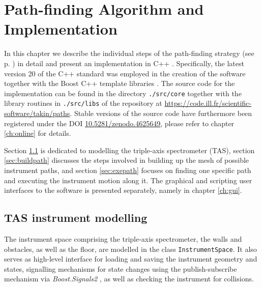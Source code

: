 %
%

\chapter{Path-finding Algorithm and Implementation}
\label{ch:impl}

In this chapter we describe the individual steps of the path-finding strategy (see p. \pageref{sec:strategy}) 
in detail and present an implementation in C++ \cite{Stroustrup2008, Stroustrup2018}. 
Specifically, the latest version 20 of the C++ standard \cite{ISOCPP20} was employed in the creation of the software
together with the Boost C++ template libraries \cite{web_boost}. The source code for the implementation
can be found in the directory \lstinline|./src/core| together with the library routines in \lstinline|./src/libs|
of the repository at \url{https://code.ill.fr/scientific-software/takin/paths}. Stable versions of the
source code have furthermore been registered under the DOI \href{https://doi.org/10.5281/zenodo.4625649}{10.5281/zenodo.4625649},
please refer to chapter \ref{ch:online} for details.

Section \ref{sec:tasmodel} is dedicated to modelling the triple-axis spectrometer (TAS), 
section \ref{sec:buildpath} discusses the steps involved in building up the mesh of possible instrument paths, 
and section \ref{sec:exepath} focuses on finding one specific path and executing the instrument motion along it.
The graphical and scripting user interfaces to the software is presented separately, namely in chapter \ref{ch:gui}.




\section{TAS instrument modelling}
\label{sec:tasmodel}

The instrument space comprising the triple-axis spectrometer, the walls and obstacles, as well as the floor, are modelled in
the class \lstinline[language=C++]|InstrumentSpace|. It also serves as high-level interface for loading and saving
the instrument geometry and states, signalling mechanisms for state changes using the publish-subscribe mechanism
via \textit{Boost.Signals2} \cite{web_boost_signals}, as well as checking the instrument for collisions.

